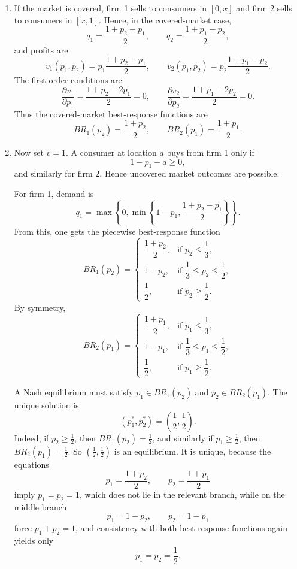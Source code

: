 \documentclass[12pt,a4paper]{article}
\begin{document}
\begin{enumerate}[label=(\alph*)]
  \item If the market is covered, firm 1 sells to consumers in $[0,x]$ and firm 2 sells to consumers in $[x,1]$. Hence, in the covered-market case,
  \[
      q_1=\frac{1+p_2-p_1}{2},
      \qquad
      q_2=\frac{1+p_1-p_2}{2},
  \]
  and profits are
  \[
      v_1(p_1,p_2)=p_1\frac{1+p_2-p_1}{2},
      \qquad
      v_2(p_1,p_2)=p_2\frac{1+p_1-p_2}{2}.
  \]
  The first-order conditions are
  \[
      \frac{\partial v_1}{\partial p_1}=\frac{1+p_2-2p_1}{2}=0,
      \qquad
      \frac{\partial v_2}{\partial p_2}=\frac{1+p_1-2p_2}{2}=0.
  \]
  Thus the covered-market best-response functions are
  \[
      BR_1(p_2)=\frac{1+p_2}{2},
      \qquad
      BR_2(p_1)=\frac{1+p_1}{2}.
  \]

  \item Now set $v=1$. A consumer at location $a$ buys from firm 1 only if
  \[
      1-p_1-a\ge 0,
  \]
  and similarly for firm 2. Hence uncovered market outcomes are possible.

  For firm 1, demand is
  \[
      q_1=\max\left\{0,\min\left\{1-p_1,\frac{1+p_2-p_1}{2}\right\}\right\}.
  \]
  From this, one gets the piecewise best-response function
  \[
      BR_1(p_2)=
      \begin{cases}
          \dfrac{1+p_2}{2}, & \text{if } p_2\le \dfrac13,\\
          1-p_2, & \text{if } \dfrac13\le p_2\le \dfrac12,\\
          \dfrac12, & \text{if } p_2\ge \dfrac12.
      \end{cases}
  \]
  By symmetry,
  \[
      BR_2(p_1)=
      \begin{cases}
          \dfrac{1+p_1}{2}, & \text{if } p_1\le \dfrac13,\\
          1-p_1, & \text{if } \dfrac13\le p_1\le \dfrac12,\\
          \dfrac12, & \text{if } p_1\ge \dfrac12.
      \end{cases}
  \]

  A Nash equilibrium must satisfy $p_1\in BR_1(p_2)$ and $p_2\in BR_2(p_1)$. The unique solution is
  \[
      (p_1^*,p_2^*)=\left(\frac12,\frac12\right).
  \]
  Indeed, if $p_2\ge \frac12$, then $BR_1(p_2)=\frac12$, and similarly if $p_1\ge \frac12$, then $BR_2(p_1)=\frac12$. So $\left(\frac12,\frac12\right)$ is an equilibrium. It is unique, because the equations
  \[
      p_1=\frac{1+p_2}{2}, \qquad p_2=\frac{1+p_1}{2}
  \]
  imply $p_1=p_2=1$, which does not lie in the relevant branch, while on the middle branch
  \[
      p_1=1-p_2, \qquad p_2=1-p_1
  \]
  force $p_1+p_2=1$, and consistency with both best-response functions again yields only
  \[
      p_1=p_2=\frac12.
  \]


\end{enumerate}
\end{document}
